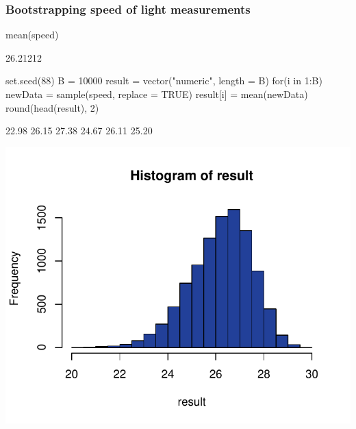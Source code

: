 \documentclass[a4paper]{article}\usepackage[]{graphicx}\usepackage[]{xcolor}
\makeatletter
\def\maxwidth{ %
  \ifdim\Gin@nat@width>\linewidth
    \linewidth
  \else
    \Gin@nat@width
  \fi
}
\makeatother
\begin{document}
\subsubsection{Bootstrapping speed of light measurements}
\begin{Schunk}
\begin{Sinput}
mean(speed)
\end{Sinput}
\begin{Soutput}
[1] 26.21212
\end{Soutput}
\begin{Sinput}
set.seed(88)
B = 10000
result = vector("numeric", length = B)
for(i in 1:B){
  newData = sample(speed, replace = TRUE)
  result[i] = mean(newData)
}
round(head(result), 2)
\end{Sinput}
\begin{Soutput}
[1] 22.98 26.15 27.38 24.67 26.11 25.20
\end{Soutput}


{\centering \includegraphics[width=\maxwidth]{figure/listings-unnamed-chunk-166-1} 

}

\end{Schunk}
\end{document}
